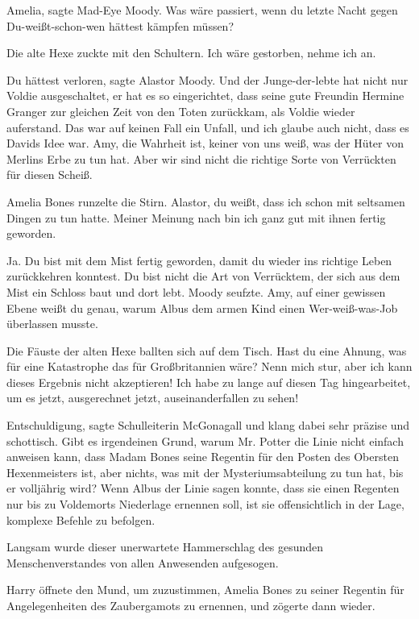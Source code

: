 \glqq{}Amelia\grqq{}, sagte Mad-Eye Moody. \glqq{}Was wäre passiert, wenn du
letzte Nacht gegen Du-weißt-schon-wen hättest kämpfen müssen?\grqq{}

Die alte Hexe zuckte mit den Schultern. \glqq{}Ich wäre gestorben, nehme ich an.\grqq{}

\glqq{}Du hättest verloren\grqq{}, sagte Alastor Moody. \glqq{}Und der
Junge-der-lebte hat nicht nur Voldie ausgeschaltet, er hat es so eingerichtet,
dass seine gute Freundin Hermine Granger zur gleichen Zeit von den Toten
zurückkam, als Voldie wieder auferstand. Das war auf keinen Fall ein Unfall, und
ich glaube auch nicht, dass es Davids Idee war. Amy, die Wahrheit ist, keiner
von uns weiß, was der Hüter von Merlins Erbe zu tun hat. Aber wir sind nicht die
richtige Sorte von Verrückten für diesen Scheiß.\grqq{}

Amelia Bones runzelte die Stirn. \glqq{}Alastor, du weißt, dass ich schon mit
seltsamen Dingen zu tun hatte. Meiner Meinung nach bin ich ganz gut mit ihnen
fertig geworden.\grqq{}

\glqq{}Ja. Du bist mit dem Mist fertig geworden, damit du wieder ins richtige
Leben zurückkehren konntest. Du bist nicht die Art von Verrücktem, der sich aus
dem Mist ein Schloss baut und dort lebt.\grqq{} Moody seufzte. \glqq{}Amy, auf einer
gewissen Ebene weißt du genau, warum Albus dem armen Kind einen Wer-weiß-was-Job
überlassen musste.\grqq{}

Die Fäuste der alten Hexe ballten sich auf dem Tisch. \glqq{}Hast du eine Ahnung,
was für eine Katastrophe das für Großbritannien wäre? Nenn mich stur, aber ich
kann dieses Ergebnis nicht akzeptieren! Ich habe zu lange auf diesen Tag
hingearbeitet, um es jetzt, ausgerechnet jetzt, auseinanderfallen zu sehen!\grqq{}

\glqq{}Entschuldigung\grqq{}, sagte Schulleiterin McGonagall und klang dabei sehr
präzise und schottisch. \glqq{}Gibt es irgendeinen Grund, warum Mr. Potter die
Linie nicht einfach anweisen kann, dass Madam Bones seine Regentin für den
Posten des Obersten Hexenmeisters ist, aber nichts, was mit der
Mysteriumsabteilung zu tun hat, bis er volljährig wird? Wenn Albus der Linie
sagen konnte, dass sie einen Regenten nur bis zu Voldemorts Niederlage ernennen
soll, ist sie offensichtlich in der Lage, komplexe Befehle zu befolgen.\grqq{}

Langsam wurde dieser unerwartete Hammerschlag des gesunden Menschenverstandes
von allen Anwesenden aufgesogen.

Harry öffnete den Mund, um zuzustimmen, Amelia Bones zu seiner Regentin für
Angelegenheiten des Zaubergamots zu ernennen, und zögerte dann wieder.

